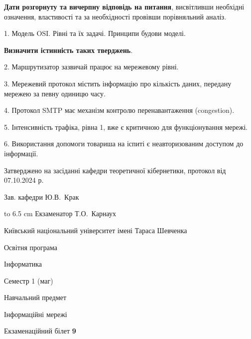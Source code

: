 \documentclass[12pt, ukrainian]{article}
\begin{document}
{
\qquad\textbf{Дати розгорнуту та вичерпну відповідь на питання}, висвітливши необхідні означення, властивості та за необхідності провівши порівняльний аналіз.

1. Модель OSI. Рівні та їх задачі. Принципи будови моделі.



\qquad\textbf{Визначити істинність таких тверджень}.

2. Маршрутизатор зазвичай працює на мережевому рівні.


3. Мережевий протокол містить інформацію про кількість даних, передану мережею за певну одиницю часу.


4. Протокол SMTP має механізм контролю перенавантаження (congestion).


5. Інтенсивність трафіка, рівна 1, вже є критичною для функціонування мережі.


6. Використання допомоги товариша на іспиті є неавторизованим доступом до інформації.

}
{\smallskip\smallskip \begin {scriptsize} Затверджено на засіданні кафедри теоретичної кібернетики, протокол   від   07.10.2024 р.\par\smallskip\smallskip\smallskip\smallskip
{\parbox {6.5 cm} {Зав. кафедри \dotfill Ю.В.~Крак}}\hspace {0.7cm} {\hbox to 6.5 cm { Екзаменатор \dotfill Т.О.~Карнаух}} \end{scriptsize}}
\vspace{0.9cm}
{{\begin {scriptsize}\par
{ \center  Київський національний університет імені Тараса Шевченка \par}
{\parbox {5 cm}{Освітня програма \hfill}{\parbox {7 cm}{Інформатика\hfill}}\parbox {6 cm}{\hfill Семестр 1 (маг)}}\par
{\parbox {5 cm} {Навчальний предмет \hfill}\parbox {7 cm}{Інформаційні мережі \hfill}\parbox {6cm}{\hfill}\par}\vspace{-15pt} \end{scriptsize}}{\center Екзаменаційний білет \No \textbf { 9 }\par}}
\end{document}

